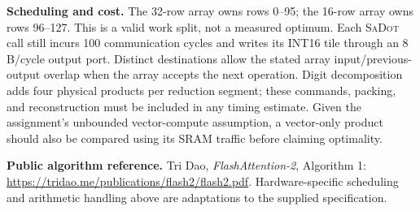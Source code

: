 \documentclass[11pt]{article}
\begin{document}
\textbf{Scheduling and cost.} The 32-row array owns rows 0--95; the 16-row array
owns rows 96--127. This is a valid work split, not a measured optimum. Each
\textsc{SaDot} call still incurs 100 communication cycles and writes its INT16
tile through an 8 B/cycle output port. Distinct destinations allow the stated
array input/previous-output overlap when the array accepts the next operation.
Digit decomposition adds four physical products per reduction segment; these
commands, packing, and reconstruction must be included in any timing estimate.
Given the assignment's unbounded vector-compute assumption, a vector-only
product should also be compared using its SRAM traffic before claiming optimality.

\textbf{Public algorithm reference.} Tri Dao, \emph{FlashAttention-2}, Algorithm 1:
\url{https://tridao.me/publications/flash2/flash2.pdf}.
Hardware-specific scheduling and arithmetic handling above are adaptations to
the supplied specification.
\end{document}

